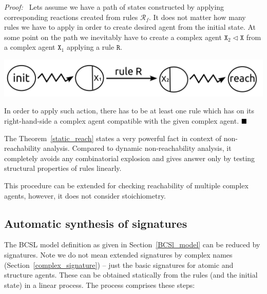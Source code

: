 \documentclass[12pt]{fithesis2}
\newenvironment{proof}{\noindent\textit{Proof:~ }\nopagebreak}{\bigskip}
\newcommand*{\QEDA}{\hfill\ensuremath{\blacksquare}}%
\begin{document}
\begin{proof}
Lets assume we have a path of states constructed by applying corresponding reactions created from rules $\mathcal{R}_f$. It does not matter how many rules we have to apply in order to create desired agent from the initial state. At some point on the path we inevitably have to create a complex agent $\mathtt{X}_2 \lhd \mathtt{X}$ from a complex agent $\mathtt{X}_1$ applying a rule $\mathtt{R}$. 

\begin{center}
\includegraphics[scale=0.15]{pics/static_reach}
\end{center}

In order to apply such action, there has to be at least one rule which has on its right-hand-side a complex agent compatible with the given complex agent. $\QEDA$
\end{proof}

The Theorem~\ref{static_reach} states a very powerful fact in context of non-reachability analysis. Compared to dynamic non-reachability analysis, it completely avoids any combinatorial explosion and gives answer only by testing structural properties of rules linearly.

This procedure can be extended for checking reachability of multiple complex agents, however, it does not consider stoichiometry.

\subsection{Automatic synthesis of signatures}

The BCSL model definition as given in Section~\ref{BCSl_model} can be reduced by signatures. Note we do not mean extended signatures by complex names (Section~\ref{complex_signature}) -- just the basic signatures for atomic and structure agents. These can be obtained statically from the rules (and the initial state) in a  linear process. The process comprises these steps:
\end{document}
